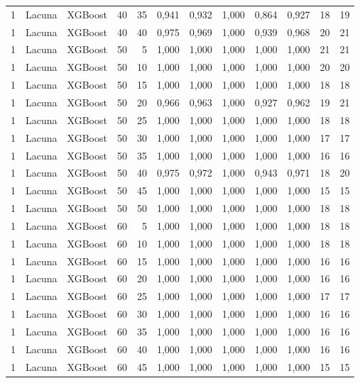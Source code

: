 \begin{longtable}{ccclrrrrrrrr}
1 & Lacuna & XGBoost & 40 & 35 & 0,941 & 0,932 & 1,000 & 0,864 & 0,927 & 18 & 19 \\
1 & Lacuna & XGBoost & 40 & 40 & 0,975 & 0,969 & 1,000 & 0,939 & 0,968 & 20 & 21 \\
1 & Lacuna & XGBoost & 50 & 5 & 1,000 & 1,000 & 1,000 & 1,000 & 1,000 & 21 & 21 \\
1 & Lacuna & XGBoost & 50 & 10 & 1,000 & 1,000 & 1,000 & 1,000 & 1,000 & 20 & 20 \\
1 & Lacuna & XGBoost & 50 & 15 & 1,000 & 1,000 & 1,000 & 1,000 & 1,000 & 18 & 18 \\
1 & Lacuna & XGBoost & 50 & 20 & 0,966 & 0,963 & 1,000 & 0,927 & 0,962 & 19 & 21 \\
1 & Lacuna & XGBoost & 50 & 25 & 1,000 & 1,000 & 1,000 & 1,000 & 1,000 & 18 & 18 \\
1 & Lacuna & XGBoost & 50 & 30 & 1,000 & 1,000 & 1,000 & 1,000 & 1,000 & 17 & 17 \\
1 & Lacuna & XGBoost & 50 & 35 & 1,000 & 1,000 & 1,000 & 1,000 & 1,000 & 16 & 16 \\
1 & Lacuna & XGBoost & 50 & 40 & 0,975 & 0,972 & 1,000 & 0,943 & 0,971 & 18 & 20 \\
1 & Lacuna & XGBoost & 50 & 45 & 1,000 & 1,000 & 1,000 & 1,000 & 1,000 & 15 & 15 \\
1 & Lacuna & XGBoost & 50 & 50 & 1,000 & 1,000 & 1,000 & 1,000 & 1,000 & 18 & 18 \\
1 & Lacuna & XGBoost & 60 & 5 & 1,000 & 1,000 & 1,000 & 1,000 & 1,000 & 18 & 18 \\
1 & Lacuna & XGBoost & 60 & 10 & 1,000 & 1,000 & 1,000 & 1,000 & 1,000 & 18 & 18 \\
1 & Lacuna & XGBoost & 60 & 15 & 1,000 & 1,000 & 1,000 & 1,000 & 1,000 & 16 & 16 \\
1 & Lacuna & XGBoost & 60 & 20 & 1,000 & 1,000 & 1,000 & 1,000 & 1,000 & 16 & 16 \\
1 & Lacuna & XGBoost & 60 & 25 & 1,000 & 1,000 & 1,000 & 1,000 & 1,000 & 17 & 17 \\
1 & Lacuna & XGBoost & 60 & 30 & 1,000 & 1,000 & 1,000 & 1,000 & 1,000 & 16 & 16 \\
1 & Lacuna & XGBoost & 60 & 35 & 1,000 & 1,000 & 1,000 & 1,000 & 1,000 & 16 & 16 \\
1 & Lacuna & XGBoost & 60 & 40 & 1,000 & 1,000 & 1,000 & 1,000 & 1,000 & 16 & 16 \\
1 & Lacuna & XGBoost & 60 & 45 & 1,000 & 1,000 & 1,000 & 1,000 & 1,000 & 15 & 15 \\

\end{longtable}

